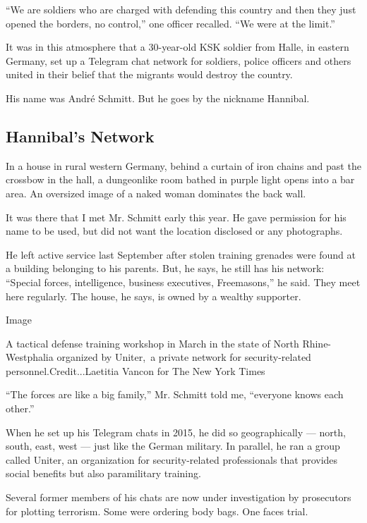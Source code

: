 ``We are soldiers who are charged with defending this country and then
they just opened the borders, no control,'' one officer recalled. ``We
were at the limit.''

It was in this atmosphere that a 30-year-old KSK soldier from Halle, in
eastern Germany, set up a Telegram chat network for soldiers, police
officers and others united in their belief that the migrants would
destroy the country.

His name was André Schmitt. But he goes by the nickname Hannibal.

\hypertarget{hannibals-network}{%
\subsection{Hannibal's Network}\label{hannibals-network}}

In a house in rural western Germany, behind a curtain of iron chains and
past the crossbow in the hall, a dungeonlike room bathed in purple light
opens into a bar area. An oversized image of a naked woman dominates the
back wall.

It was there that I met Mr. Schmitt early this year. He gave permission
for his name to be used, but did not want the location disclosed or any
photographs.

He left active service last September after stolen training grenades
were found at a building belonging to his parents. But, he says, he
still has his network: ``Special forces, intelligence, business
executives, Freemasons,'' he said. They meet here regularly. The house,
he says, is owned by a wealthy supporter.

Image

A tactical defense training workshop in March in the state of North
Rhine-Westphalia organized by Uniter,~a private network for
security-related personnel.Credit...Laetitia Vancon for The New York
Times

``The forces are like a big family,'' Mr. Schmitt told me, ``everyone
knows each other.''

When he set up his Telegram chats in 2015, he did so geographically ---
north, south, east, west --- just like the German military. In parallel,
he ran a group called Uniter, an organization for security-related
professionals that provides social benefits but also paramilitary
training.

Several former members of his chats are now under investigation by
prosecutors for plotting terrorism. Some were ordering body bags. One
faces trial.

